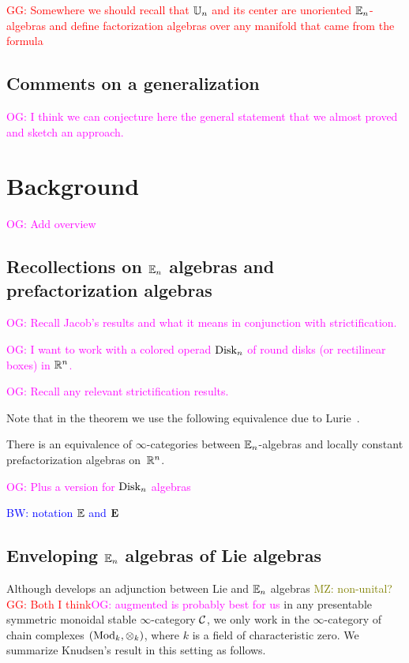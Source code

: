 \documentclass[11pt]{amsart}
\numberwithin{equation}{section}
\def\brian{\textcolor{blue}{BW: }\textcolor{blue}}
\def\owen{\textcolor{magenta}{OG: }\textcolor{magenta}}
\def\mahmoud{\textcolor{olive}{MZ: }\textcolor{olive}}
\def\greg{\textcolor{red}{GG: }\textcolor{red}}
\begin{document}
\greg{Somewhere we should recall that $\mathbb U_n$ and its center are unoriented $\mathbb E_n$-algebras and define factorization algebras over any manifold that came from the formula}

\subsection{Comments on a generalization}

\owen{I think we can conjecture here the general statement that we almost proved and sketch an approach.}

\section{Background}
\label{sec: background}

\owen{Add overview}

\subsection{Recollections on $\mathbb E_n$ algebras and prefactorization algebras}
\label{sec: en background}

\owen{Recall Jacob's results and what it means in conjunction with strictification.}

\owen{I want to work with a colored operad ${\rm Disk}_n$ of round disks (or rectilinear boxes) in $\mathbb R^n$.}

\owen{Recall any relevant strictification results.}

Note that in the theorem we use the following equivalence due to Lurie~\cite{LurieHA}. 

\begin{thm}
\label{thm:lurie1} 
There is an equivalence of $\infty$-categories between $\mathbb E_n$-algebras and locally constant prefactorization algebras on~$\mathbb R^n$. 
\end{thm}

\owen{Plus a version for ${\rm Disk}_n$ algebras}

\brian{notation $\mathbb E$ and $\mathbf E$}

\subsection{Enveloping $\mathbb E_n$ algebras of Lie algebras}
\label{sec: enveloping}

Although \cite{Knudsen} develops an adjunction between Lie and $\mathbb E_n$ algebras \mahmoud{non-unital?}\greg{Both I think}\owen{augmented is probably best for us}
in any presentable symmetric monoidal stable $\infty$-category $\mathcal C$,
we only work in the $\infty$-category of chain complexes $({\rm Mod}_k, \otimes_k)$, 
where $k$ is a field of characteristic zero.
We summarize Knudsen's result in this setting as follows.
\end{document}
